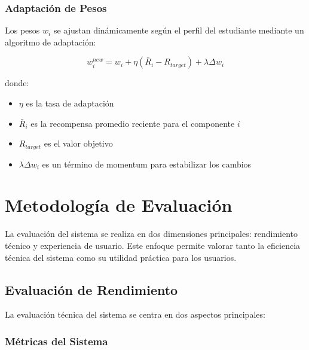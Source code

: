 \subsubsection{Adaptación de Pesos}

Los pesos $w_i$ se ajustan dinámicamente según el perfil del estudiante mediante un algoritmo de adaptación:

\begin{equation}
    w_i^{new} = w_i + \eta(\bar{R}_i - R_{target}) + \lambda\Delta w_i
\end{equation}

donde:
\begin{itemize}
    \item $\eta$ es la tasa de adaptación
    \item $\bar{R}_i$ es la recompensa promedio reciente para el componente $i$
    \item $R_{target}$ es el valor objetivo
    \item $\lambda\Delta w_i$ es un término de momentum para estabilizar los cambios
\end{itemize}

\section{Metodología de Evaluación}
\label{metodologia-evaluacion}

La evaluación del sistema se realiza en dos dimensiones principales: rendimiento técnico y experiencia de usuario. Este enfoque permite valorar tanto la eficiencia técnica del sistema como su utilidad práctica para los usuarios.

\subsection{Evaluación de Rendimiento}
\label{evaluacion-rendimiento}

La evaluación técnica del sistema se centra en dos aspectos principales:

\subsubsection{Métricas del Sistema}

